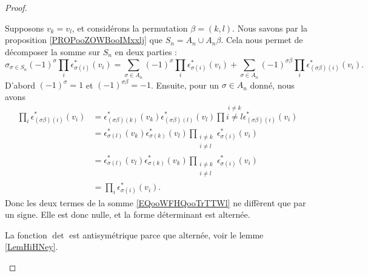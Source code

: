 \begin{proof}
\begin{subproof}
            Supposons \( v_k=v_l\), et considérons la permutation \( \beta=(k,l)\). Nous savons par la proposition \ref{PROPooZOWBooIMxxlj} que \( S_n=A_n\cup A_n\beta\). Cela nous permet de décomposer la somme sur \( S_n\) en deux parties :
            \begin{equation}        \label{EQooWFHQooTrTTWl}
                \sigma_{\sigma\in S_n}(-1)^{\sigma}\prod_i\epsilon_{\sigma(i)}^*(v_i)=\sum_{\sigma\in A_n}(-1)^{\sigma}\prod_i\epsilon_{\sigma(i)}^*(v_i)+\sum_{\sigma\in A_n}(-1)^{\sigma\beta}\prod_i\epsilon_{(\sigma\beta)(i)}^*(v_i).
            \end{equation}
            D'abord \( (-1)^{\sigma}=1\) et \( (-1)^{\sigma\beta}=-1\). Ensuite, pour un \( \sigma\in A_n\) donné, nous avons
            \begin{subequations}
                \begin{align}
                    \prod_i\epsilon^*_{(\sigma\beta)(i)}(v_i)&=\epsilon_{(\sigma\beta)(k)}^*(v_k)\epsilon^*_{(\sigma\beta)(l)}(v_l)\prod\stackrel{i\neq k}{i\neq l}\epsilon_{(\sigma\beta)(i)}^*(v_i)\\
                    &=\epsilon^*_{\sigma(l)}(v_k)\epsilon^*_{\sigma(k)}(v_l)\prod_{\substack{i\neq k\\i\neq l}}\epsilon^*_{\sigma(i)}(v_i)\\
                    &=\epsilon^*_{\sigma(l)}(v_l)\epsilon^*_{\sigma(k)}(v_k)\prod_{\substack{i\neq k\\i\neq l}}\epsilon^*_{\sigma(i)}(v_i)\\
                    &=\prod_i\epsilon^*_{\sigma(i)}(v_i).
                \end{align}
            \end{subequations}
            Donc les deux termes de la somme \eqref{EQooWFHQooTrTTWl} ne diffèrent que par un signe. Elle est donc nulle, et la forme déterminant est alternée.    
        
            La fonction \( \det\) est antisymétrique parce que alternée, voir le lemme \ref{LemHiHNey}.


\end{subproof}
\end{proof}
